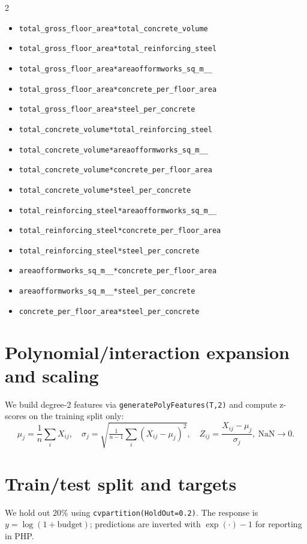 \documentclass[11pt]{article}
\begin{document}
\begin{multicols}{2}
\begin{itemize}[leftmargin=*]
  \item \verb|total_gross_floor_area*total_concrete_volume|\item \verb|total_gross_floor_area*total_reinforcing_steel|\item \verb|total_gross_floor_area*areaofformworks_sq_m__|\item \verb|total_gross_floor_area*concrete_per_floor_area|\item \verb|total_gross_floor_area*steel_per_concrete|
  \item \verb|total_concrete_volume*total_reinforcing_steel|\item \verb|total_concrete_volume*areaofformworks_sq_m__|\item \verb|total_concrete_volume*concrete_per_floor_area|\item \verb|total_concrete_volume*steel_per_concrete|
  \item \verb|total_reinforcing_steel*areaofformworks_sq_m__|\item \verb|total_reinforcing_steel*concrete_per_floor_area|\item \verb|total_reinforcing_steel*steel_per_concrete|
  \item \verb|areaofformworks_sq_m__*concrete_per_floor_area|\item \verb|areaofformworks_sq_m__*steel_per_concrete|
  \item \verb|concrete_per_floor_area*steel_per_concrete|
\end{itemize}
\end{multicols}
\normalsize

\section*{Polynomial/interaction expansion and scaling}
We build degree-2 features via \verb|generatePolyFeatures(T,2)| and compute z-scores on the training split only:
\[
\mu_j = \frac{1}{n}\sum_i X_{ij},\quad \sigma_j = \sqrt{\tfrac{1}{n-1}\sum_i (X_{ij}-\mu_j)^2},\quad Z_{ij}=\frac{X_{ij}-\mu_j}{\sigma_j},\ \text{NaN}\to 0.
\]

\section*{Train/test split and targets}
We hold out 20\% using \verb|cvpartition(HoldOut=0.2)|. The response is $y=\log(1+\text{budget})$; predictions are inverted with $\exp(\cdot)-1$ for reporting in PHP.
\end{document}
